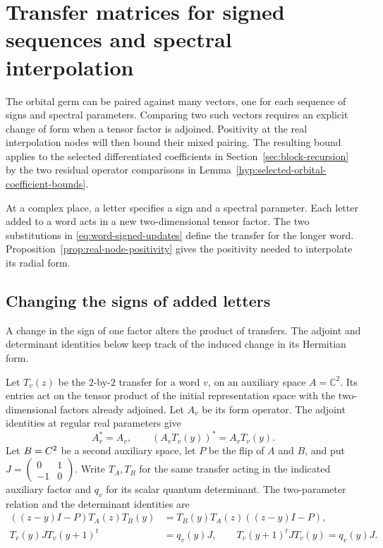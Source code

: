 \section{Transfer matrices for signed sequences and spectral interpolation}\label{sec:word-pairing}
\hypertarget{source-word-pairing}{}

The orbital germ can be paired against many vectors, one for each sequence of signs and spectral parameters. Comparing two such vectors requires an explicit change of form when a tensor factor is adjoined. Positivity at the real interpolation nodes will then bound their mixed pairing. The resulting bound applies to the selected
differentiated coefficients in Section~\ref{sec:block-recursion} by
the two residual operator comparisons in
Lemma~\ref{hyp:selected-orbital-coefficient-bounds}.

At a complex place, a letter specifies a sign and a spectral parameter. Each letter added to a word acts in a new two-dimensional tensor factor. The two substitutions in \eqref{eq:word-signed-updates} define the transfer for the longer word. Proposition~\ref{prop:real-node-positivity} gives the positivity needed to interpolate its radial form.

\subsection{Changing the signs of added letters}

A change in the sign of one factor alters the product of transfers. The adjoint and determinant identities below keep track of the induced change in its Hermitian form.

Let \(T_v(z)\) be the \(2\)-by-\(2\) transfer for a word \(v\), on an auxiliary space \(A=\mathbb C^2\). Its entries act on the tensor product of the initial representation space with the two-dimensional factors already adjoined.
Let \(A_v\) be its form operator. The adjoint identities at regular
real parameters give
\[
 A_v^*=A_v,\qquad (A_vT_v(y))^*=A_vT_v(y).
\]
Let \(B=C^2\) be a second auxiliary space, let \(P\) be the
flip of \(A\) and \(B\), and put
\(J=\left(\begin{smallmatrix}0&1\\-1&0\end{smallmatrix}\right)\).
Write \(T_A,T_B\) for the same transfer acting in the indicated auxiliary factor and \(q_v\) for its scalar quantum determinant. The two-parameter relation and the determinant identities are
\begin{align}
 ((z-y)I-P)T_A(z)T_B(y)
  &=T_B(y)T_A(z)((z-y)I-P),\label{eq:word-rtt}\\
 T_v(y)JT_v(y+1)^t&=q_v(y)J,\qquad
 T_v(y+1)^t JT_v(y)=q_v(y)J .
 \label{eq:word-qdet}
\end{align}

